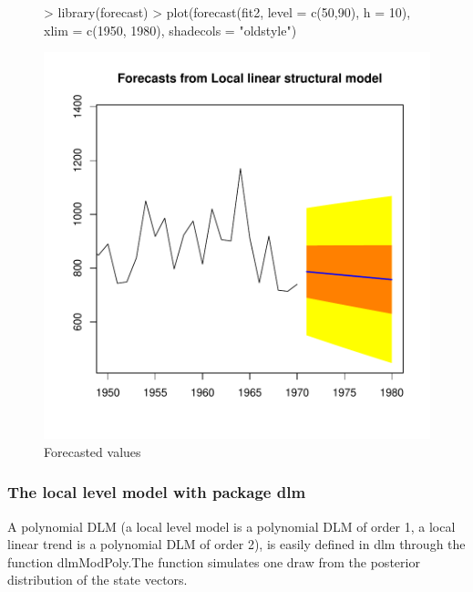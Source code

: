 \documentclass[11pt, a4paper]{article} %
\begin{document}
\begin{figure}
\centering
\begin{Schunk}
\begin{Sinput}
> library(forecast)
> plot(forecast(fit2, level = c(50,90), h = 10), xlim = c(1950, 1980), shadecols = "oldstyle")
\end{Sinput}
\end{Schunk}
\includegraphics{alles-Forecasted values}
\caption{Forecasted values}
\end{figure}

\subsubsection{The local level model with package dlm }
\noindent A polynomial DLM (a local level model is a polynomial DLM of order 1, a local linear trend is a polynomial DLM of order 2), is easily defined in dlm through the function dlmModPoly.The function simulates one draw from the posterior distribution of the state vectors.
\end{document}
